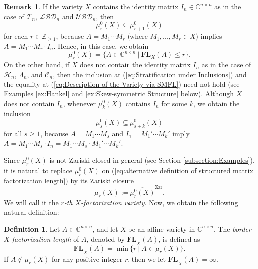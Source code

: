 \documentclass[reqno]{amsart}
\theoremstyle{definition}
\newtheorem{definition}[theorem]{Definition}
\newtheorem{remark}[theorem]{Remark}
\newcommand{\C}{\mathbb{C}}
\numberwithin{equation}{section}
\begin{document}
\begin{remark}\label{rmk:whether contains the identity matrix}
    If the variety $X$ contains the identity matrix $I_n \in \mathbb{C}^{n \times n}$ as in the case of $\mathcal{T}_n$, $\mathcal{LBD}_n$ and $\mathcal{UBD}_n$, then 
    \begin{equation}\label{eq:Stratification under Inclusions}
        \mu_r^0(X) \subseteq \mu_{r+1}^0(X)
    \end{equation}
    for each $r \in \mathbb{Z}_{\geq 1}$, because $A=M_1\cdots M_r$ (where $M_1,...,M_r \in X$) implies $A=M_1\cdots M_r \cdot I_n$. Hence, in this case, we obtain
    \begin{equation}\label{eq:Description of the Variety via SMFL}
        \mu_r^0(X)=\{A \in \mathbb{C}^{n \times n}~|~\mathbf{FL}_X(A) \leq r\}.
    \end{equation}
    On the other hand, if $X$ does not contain the identity matrix $I_n$ as in the case of $\mathcal{H}_n$, $\Lambda_n$, and $\mathcal{C}_n$, then the inclusion at (\ref{eq:Stratification under Inclusions}) and the equality at (\ref{eq:Description of the Variety via SMFL}) need not hold (see Examples \ref{ex:Hankel} and \ref{ex:Skew-symmetric Structure} below). Although $X$ does not contain $I_n$, whenever $\mu_k^0(X)$ contains $I_n$ for some $k$, we obtain the inclusion
    \begin{equation*}
        \mu_s^0(X) \subseteq \mu_{s+k}^0(X)
    \end{equation*}
    for all $s \geq 1$, because $A=M_1\cdots M_s$ and $I_n=M_1' \cdots M_k'$ imply $A=M_1\cdots M_s \cdot I_n=M_1\cdots M_s \cdot M_1' \cdots M_k'$.
\end{remark}

Since $\mu_r^0(X)$ is not Zariski closed in general (see Section \ref{subsection:Examples}), it is natural to replace $\mu_r^0(X)$ on (\ref{eq:alternative definition of structured matrix factorization length}) by its Zariski closure 
\begin{equation*}
    \mu_r(X):=\overline{\mu_r^0(X)}^{\text{Zar}}.
\end{equation*}
We will call it the \emph{$r$-th $X$-factorization variety}. Now, we obtain the following natural definition:

\begin{definition}\label{def:border structured factorization length}
    Let $A \in \C^{n \times n}$, and let $X $ be an affine variety in $\mathbb{C}^{n \times n}$. The \emph{border $X$-factorization length} of $A$, denoted by $\underline{\mathbf{FL}}_X(A)$, is defined as 
    \begin{equation*}
        \underline{\mathbf{FL}}_X(A)=\min\{r~|~A \in \mu_r(X)\}.
    \end{equation*}
    If $A \notin \mu_r(X)$ for any positive integer $r$, then we let $\underline{\mathbf{FL}}_X(A)=\infty$.
\end{definition}
\end{document}
